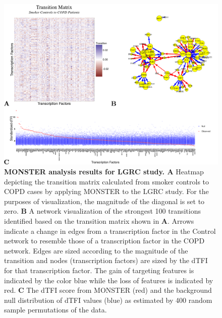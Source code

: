 \begin{figure}
\includegraphics[width=1\linewidth]{figures/figure2LGRC}
\caption[MONSTER analysis results for LGRC study]{\textbf{MONSTER analysis results for LGRC study. A } Heatmap depicting the transition matrix calculated from smoker controls to COPD cases by applying MONSTER to the LGRC study. For the purposes of visualization, the magnitude of the diagonal is set to zero. \textbf{B} A network visualization of the strongest 100 transitions identified based on the transition matrix shown in \textbf{A}. Arrows indicate a change in edges from a transcription factor in the Control network to resemble those of a transcription factor in the COPD network. Edges are sized according to the magnitude of the transition and nodes (transcription factors) are sized by the dTFI for that transcription factor. The gain of targeting features is indicated by the color blue while the loss of features is indicated by red. \textbf{C} The dTFI score from MONSTER (red) and the background null distribution of dTFI values (blue) as estimated by 400 random sample permutations of the data.}
\label{fig:figure2LGRC}
\end{figure}

